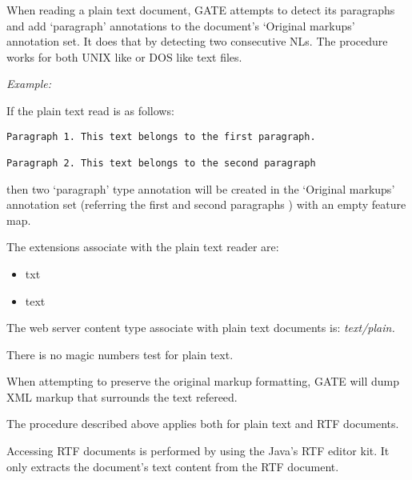 

When reading a plain text document, GATE attempts to detect its
paragraphs and add `paragraph' annotations to the document's
`Original markups' annotation set. It does that by detecting two
consecutive NLs. The procedure works for both UNIX like or DOS
like text files.

{\em Example:}

If the plain text read is as follows:

\small
\begin{small}
\begin{verbatim}
Paragraph 1. This text belongs to the first paragraph.

Paragraph 2. This text belongs to the second paragraph
\end{verbatim}
\end{small}
\nnormalsize

then two `paragraph' type annotation will be created in the
`Original markups' annotation set (referring the first and
second paragraphs ) with an empty feature map.

The extensions associate with the plain text reader are:
\begin{itemize}
\item
txt
\item
text
\end{itemize}

The web server content type associate with plain text documents
is: {\em text/plain.}

There is no magic numbers test for plain text.


When attempting to preserve the original markup formatting, GATE
will dump XML markup that surrounds the text refereed.

The procedure described above applies both for plain text and RTF
documents.




Accessing RTF documents is performed by using the Java's RTF
editor kit. It only extracts the document's text content from the
RTF document.

